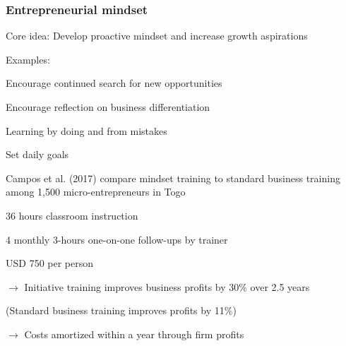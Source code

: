 \documentclass[hideothersubsections, usenames,dvipsnames,11pt]{beamer}
\newenvironment{itemize_2pt}{\itemize\addtolength{\itemsep}{2pt}}{\enditemize}
\begin{document}
\begin{frame}
\frametitle{Entrepreneurial mindset}

Core idea: \textcolor{bdf}{Develop proactive mindset and increase growth aspirations}
\begin{itemize_2pt}
	\item Examples: 
	\begin{itemize_2pt}
		\item Encourage continued search for new opportunities
		\item Encourage reflection on business differentiation
		\item Learning by doing and from mistakes
		\item Set daily goals
	\end{itemize_2pt}
	
	\vspace{1.0em}
	
	\item \textcolor{camel}{Campos et al. (2017)} compare mindset training to standard business training among 1,500 micro-entrepreneurs in Togo
	\begin{itemize_2pt}
		\item 36 hours classroom instruction
		\item 4 monthly 3-hours one-on-one follow-ups by trainer
		\item USD 750 per person
		\item[] $\rightarrow$ \textcolor{bdf}{Initiative training improves business profits by 30\% over 2.5 years}
		\item[] \quad (Standard business training improves profits by 11\%)
		\item[] $\rightarrow$ \textcolor{bdf}{Costs amortized within a year through firm profits}
	\end{itemize_2pt}

	\end{itemize_2pt}
\end{frame}
\end{document}
